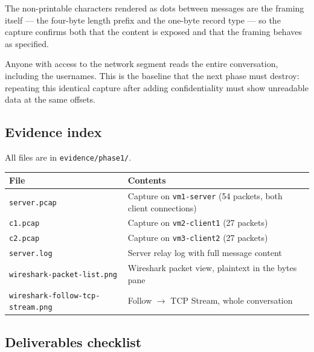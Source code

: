 \documentclass[11pt,a4paper]{article}
\begin{document}
The non-printable characters rendered as dots between messages are the framing itself --- the
four-byte length prefix and the one-byte record type --- so the capture confirms both that the
content is exposed and that the framing behaves as specified.

Anyone with access to the network segment reads the entire conversation, including the usernames.
This is the baseline that the next phase must destroy: repeating this identical capture after adding
confidentiality must show unreadable data at the same offsets.

\subsection{Evidence index}

All files are in \texttt{evidence/phase1/}.

\begin{center}
\small
\begin{tabular}{@{}ll@{}}
\toprule
\textbf{File} & \textbf{Contents} \\
\midrule
\texttt{server.pcap} & Capture on \texttt{vm1-server} (54 packets, both client connections) \\
\texttt{c1.pcap}     & Capture on \texttt{vm2-client1} (27 packets) \\
\texttt{c2.pcap}     & Capture on \texttt{vm3-client2} (27 packets) \\
\texttt{server.log}  & Server relay log with full message content \\
\texttt{wireshark-packet-list.png}        & Wireshark packet view, plaintext in the bytes pane \\
\texttt{wireshark-follow-tcp-stream.png}  & Follow $\rightarrow$ TCP Stream, whole conversation \\
\bottomrule
\end{tabular}
\end{center}

\subsection{Deliverables checklist}
\end{document}
